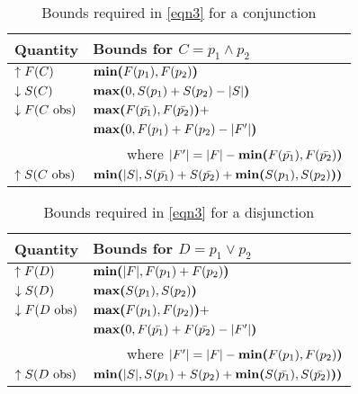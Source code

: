 \begin{table}
  \caption{Bounds required in \autoref{eqn3} for a conjunction}
  \label{tab:bounds-conj}
  \centering
  \begin{tabular}{ll}
    \toprule
    Quantity & Bounds for $C = p_1 \wedge p_2$ \\
    \midrule
    $\uparrow F(C) $
      &
      $\textbf{min(}F(p_1), F(p_2)\textbf{)}$
      \\
      
    $\downarrow S(C)$
      &
      $\textbf{max(}0, S(p_1) + S(p_2) - |S|\textbf{)}$
      \\
      
    $\downarrow F(\text{$C$ obs})$
      &
      $\textbf{max(}F(\text{$\bar{p_1}$}), F(\text{$\bar{p_2}$})\textbf{)} +$
      \\
      
      &
      $\textbf{max(}0, F(p_1) + F(p_2) - |F'|\textbf{)}$
      \\
      
      &
      \multicolumn{1}{r}{where $|F'| = |F| - \textbf{min(}F(\text{$\bar{p_1}$}), F(\text{$\bar{p_2}$})\textbf{)}$}
      \\
      
    $\uparrow S(\text{$C$ obs})$
      &
      $\textbf{min(}|S|, S(\text{$\bar{p_1}$}) + S(\text{$\bar{p_2}$}) + \textbf{min(}S(p_1), S(p_2)\textbf{)}\textbf{)}$
      \\
      \bottomrule
  \end{tabular}
\end{table}

\begin{table}
  \caption{Bounds required in \autoref{eqn3} for a disjunction}
  \label{tab:bounds-disj}
  \centering
  \begin{tabular}{ll}
    \toprule
    Quantity & Bounds for $D = p_1 \vee p_2$ \\
    \midrule
    $\uparrow F(D) $
      &
      $\textbf{min(}|F|, F(p_1) + F(p_2)\textbf{)}$
      \\
      
    $\downarrow S(D)$
      &
      $\textbf{max(}S(p_1), S(p_2)\textbf{)}$
      \\
      
    $\downarrow F(\text{$D$ obs})$
      &
      $\textbf{max(}F(p_1), F(p_2)\textbf{)} +$
      \\
      
      &
      $\textbf{max(}0, F(\text{$\bar{p_1}$}) + F(\text{$\bar{p_2}$}) - |F'|\textbf{)}$
      \\
      
      &
      \multicolumn{1}{r}{where $|F'| = |F| - \textbf{min(}F(p_1), F(p_2)\textbf{)}$}
      \\
      
    $\uparrow S(\text{$D$ obs})$
      &
      $\textbf{min(}|S|, S(p_1) + S(p_2) + \textbf{min(}S(\text{$\bar{p_1}$}), S(\text{$\bar{p_2}$})\textbf{)}\textbf{)}$
      \\
      \bottomrule
  \end{tabular}
\end{table}

